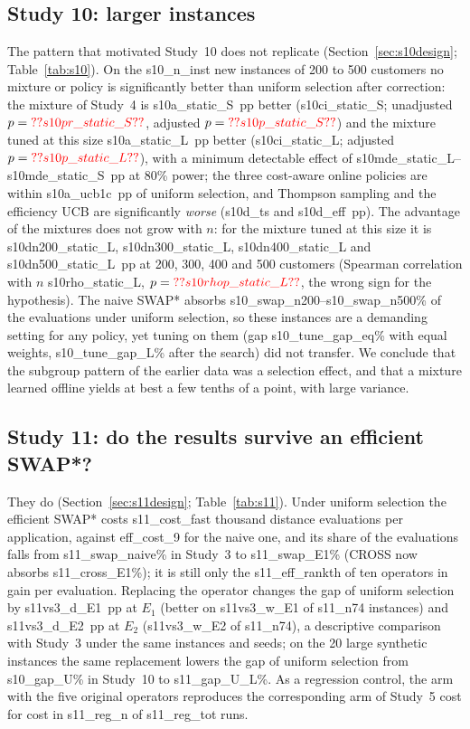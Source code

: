 \subsection{Study 10: larger instances}\label{sec:s10}
The pattern that motivated Study~10 does not replicate (Section~\ref{sec:s10design}; Table~\ref{tab:s10}). On the \num{s10_n_inst} new instances of 200 to 500 customers no mixture or policy is significantly better than uniform selection after correction: the mixture of Study~4 is \num{s10a_static_S}~pp better (\num{s10ci_static_S}; unadjusted $p=\num{s10pr_static_S}$, adjusted $p=\num{s10p_static_S}$) and the mixture tuned at this size \num{s10a_static_L}~pp better (\num{s10ci_static_L}; adjusted $p=\num{s10p_static_L}$), with a minimum detectable effect of \num{s10mde_static_L}--\num{s10mde_static_S}~pp at 80\% power; the three cost-aware online policies are within \num{s10a_ucb1c}~pp of uniform selection, and Thompson sampling and the efficiency UCB are significantly \emph{worse} (\num{s10d_ts} and \num{s10d_eff}~pp). The advantage of the mixtures does not grow with $n$: for the mixture tuned at this size it is \num{s10dn200_static_L}, \num{s10dn300_static_L}, \num{s10dn400_static_L} and \num{s10dn500_static_L}~pp at 200, 300, 400 and 500 customers (Spearman correlation with $n$ \num{s10rho_static_L}, $p=\num{s10rhop_static_L}$, the wrong sign for the hypothesis). The naive SWAP* absorbs \num{s10_swap_n200}--\num{s10_swap_n500}\% of the evaluations under uniform selection, so these instances are a demanding setting for any policy, yet tuning on them (gap \num{s10_tune_gap_eq}\% with equal weights, \num{s10_tune_gap_L}\% after the search) did not transfer. We conclude that the subgroup pattern of the earlier data was a selection effect, and that a mixture learned offline yields at best a few tenths of a point, with large variance.



\subsection{Study 11: do the results survive an efficient SWAP*?}\label{sec:s11}
They do (Section~\ref{sec:s11design}; Table~\ref{tab:s11}). Under uniform selection the efficient SWAP* costs \num{s11_cost_fast} thousand distance evaluations per application, against \num{eff_cost_9} for the naive one, and its share of the evaluations falls from \num{s11_swap_naive}\% in Study~3 to \num{s11_swap_E1}\% (CROSS now absorbs \num{s11_cross_E1}\%); it is still only the \num{s11_eff_rank}th of ten operators in gain per evaluation. Replacing the operator changes the gap of uniform selection by \num{s11vs3_d_E1}~pp at $E_1$ (better on \num{s11vs3_w_E1} of \num{s11_n74} instances) and \num{s11vs3_d_E2}~pp at $E_2$ (\num{s11vs3_w_E2} of \num{s11_n74}), a descriptive comparison with Study~3 under the same instances and seeds; on the 20 large synthetic instances the same replacement lowers the gap of uniform selection from \num{s10_gap_U}\% in Study~10 to \num{s11_gap_U_L}\%. As a regression control, the arm with the five original operators reproduces the corresponding arm of Study~5 cost for cost in \num{s11_reg_n} of \num{s11_reg_tot} runs.

